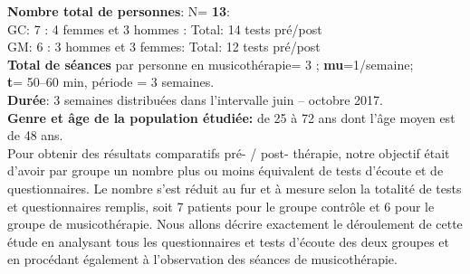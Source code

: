 \textbf{Nombre total de personnes}: N=  \textbf{13}:
\\
	GC: 7 : 4 femmes et 3 hommes : Total: 14 tests pré/post
\\ 	
	GM: 6 : 3 hommes et 3 femmes: Total: 12 tests pré/post
	\\
\textbf{Total de séances} par personne en
   musicothérapie= 3 ;   \textbf{mu}=1/semaine;
   \\
 \textbf{t}= 50--60 min, période = 3 semaines.
 \\
  \textbf{Durée}: 3 semaines distribuées dans l'intervalle juin -- octobre 2017.
  \\
 \textbf{Genre et âge de la population étudiée:}  de 25 à 72
 ans dont l'âge moyen est de 48 ans.
 \\
 Pour obtenir des  résultats comparatifs pré- / post- thé\-ra\-pie, notre  objectif était d'avoir par groupe 
 un nombre   
   plus ou moins équivalent de tests d'écoute et de  questionnaires. Le nombre s'est réduit au fur et à 
   mesure selon la totalité de tests et questionnaires remplis, soit  7 patients pour le groupe contrôle et 6 
   pour le groupe de musicothérapie.
 Nous allons décrire exactement le déroulement de cette étude en analysant 
 tous les questionnaires et tests d'écoute des deux groupes et en procédant également à l'observation 
 des séances de musicothérapie.
 


